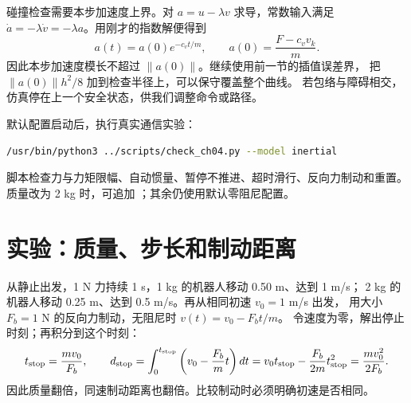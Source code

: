 碰撞检查需要本步加速度上界。对 $a=u-\lambda v$ 求导，常数输入满足
$\dot a=-\lambda\dot v=-\lambda a$。用刚才的指数解便得到
\begin{equation}
a(t)=a(0)e^{-c_vt/m},\qquad
a(0)=\frac{F-c_vv_k}{m}.
\end{equation}
因此本步加速度模长不超过 $\|a(0)\|$。继续使用前一节的插值误差界，
把 $\|a(0)\|h^2/8$ 加到检查半径上，可以保守覆盖整个曲线。
若包络与障碍相交，仿真停在上一个安全状态，供我们调整命令或路径。

\par\noindent\begin{minipage}{\linewidth}
\begin{center}
\end{center}
\end{minipage}\par

默认配置启动后，执行真实通信实验：
\begin{lstlisting}[language=bash,numbers=none]
/usr/bin/python3 ../scripts/check_ch04.py --model inertial
\end{lstlisting}
脚本检查力与力矩限幅、自动惯量、暂停不推进、超时滑行、反向力制动和重置。
质量改为 2 kg 时，可追加 ；其余仍使用默认零阻尼配置。

\section{实验：质量、步长和制动距离}
从静止出发，1 N 力持续 1 s，1 kg 的机器人移动 0.50 m、达到 1 m/s；
2 kg 的机器人移动 0.25 m、达到 0.5 m/s。再从相同初速 $v_0=1$ m/s 出发，
用大小 $F_b=1$ N 的反向力制动，无阻尼时 $v(t)=v_0-F_bt/m$。
令速度为零，解出停止时刻；再积分到这个时刻：
\begin{equation}
t_{\rm stop}=\frac{m v_0}{F_b},\qquad
d_{\rm stop}=\int_0^{t_{\rm stop}}\left(v_0-\frac{F_b}{m}t\right)dt
=v_0t_{\rm stop}-\frac{F_b}{2m}t_{\rm stop}^2=\frac{m v_0^2}{2F_b}.
\end{equation}
因此质量翻倍，同速制动距离也翻倍。比较制动时必须明确初速是否相同。

